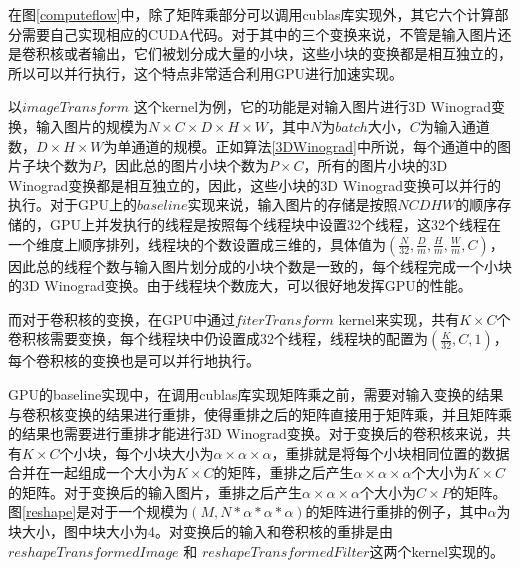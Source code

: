 在图\ref{computeflow}中，除了矩阵乘部分可以调用cublas库实现外，其它六个计算部分需要自己实现相应的CUDA代码。对于其中的三个变换来说，不管是输入图片还是卷积核或者输出，它们被划分成大量的小块，这些小块的变换都是相互独立的，所以可以并行执行，这个特点非常适合利用GPU进行加速实现。

以$imageTransform$ 这个kernel为例，它的功能是对输入图片进行3D Winograd变换，输入图片的规模为$N \times C \times D \times H \times W$，其中$N$为$batch$大小，$C$为输入通道数，$D \times H \times W$为单通道的规模。正如算法\ref{3DWinograd}中所说，每个通道中的图片子块个数为$P$，因此总的图片小块个数为$P \times C$，所有的图片小块的3D Winograd变换都是相互独立的，因此，这些小块的3D Winograd变换可以并行的执行。对于GPU上的$baseline$实现来说，输入图片的存储是按照$NCDHW$的顺序存储的，GPU上并发执行的线程是按照每个线程块中设置32个线程，这32个线程在一个维度上顺序排列，线程块的个数设置成三维的，具体值为$(\frac{N}{32},\frac{D}{m},\frac{H}{m},\frac{W}{m},C)$，因此总的线程个数与输入图片划分成的小块个数是一致的，每个线程完成一个小块的3D Winograd变换。由于线程块个数庞大，可以很好地发挥GPU的性能。

而对于卷积核的变换，在GPU中通过$fiterTransform$ kernel来实现，共有$K \times C$个卷积核需要变换，每个线程块中仍设置成32个线程，线程块的配置为$(\frac{K}{32},C,1)$，每个卷积核的变换也是可以并行地执行。

GPU的baseline实现中，在调用cublas库实现矩阵乘之前，需要对输入变换的结果与卷积核变换的结果进行重排，使得重排之后的矩阵直接用于矩阵乘，并且矩阵乘的结果也需要进行重排才能进行3D Winograd变换。对于变换后的卷积核来说，共有$K \times C$个小块，每个小块大小为$\alpha \times \alpha \times \alpha$，重排就是将每个小块相同位置的数据合并在一起组成一个大小为$K \times C$的矩阵，重排之后产生$\alpha \times \alpha \times \alpha$个大小为$K \times C$的矩阵。对于变换后的输入图片，重排之后产生$\alpha \times \alpha \times \alpha$个大小为$C \times P$的矩阵。图\ref{reshape}是对于一个规模为$(M,N*\alpha *\alpha *\alpha)$的矩阵进行重排的例子，其中$\alpha$为块大小，图中块大小为4。对变换后的输入和卷积核的重排是由$reshapeTransformedImage$ 和 $reshapeTransformedFilter$这两个kernel实现的。

